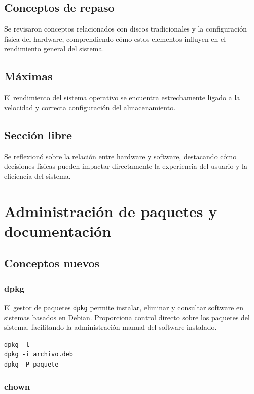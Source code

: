 \documentclass[11pt, letterpaper]{article}
\begin{document}
\subsection{Conceptos de repaso}
\label{sec:orgd5b1388}

Se revisaron conceptos relacionados con discos tradicionales y la
configuración física del hardware, comprendiendo cómo estos elementos
influyen en el rendimiento general del sistema.
\subsection{Máximas}
\label{sec:org3dac536}

El rendimiento del sistema operativo se encuentra estrechamente ligado
a la velocidad y correcta configuración del almacenamiento.
\subsection{Sección libre}
\label{sec:org341db17}

Se reflexionó sobre la relación entre hardware y software, destacando
cómo decisiones físicas pueden impactar directamente la experiencia del
usuario y la eficiencia del sistema.
\section{Administración de paquetes y documentación}
\label{sec:org3627ba3}

\subsection{Conceptos nuevos}
\label{sec:org433a275}

\subsubsection{dpkg}
\label{sec:orgaa972e0}

El gestor de paquetes \texttt{dpkg} permite instalar, eliminar y consultar
software en sistemas basados en Debian. Proporciona control directo
sobre los paquetes del sistema, facilitando la administración manual
del software instalado.

\begin{verbatim}
dpkg -l
dpkg -i archivo.deb
dpkg -P paquete
\end{verbatim}
\subsubsection{chown}
\label{sec:orgd4ace4b}
\end{document}
